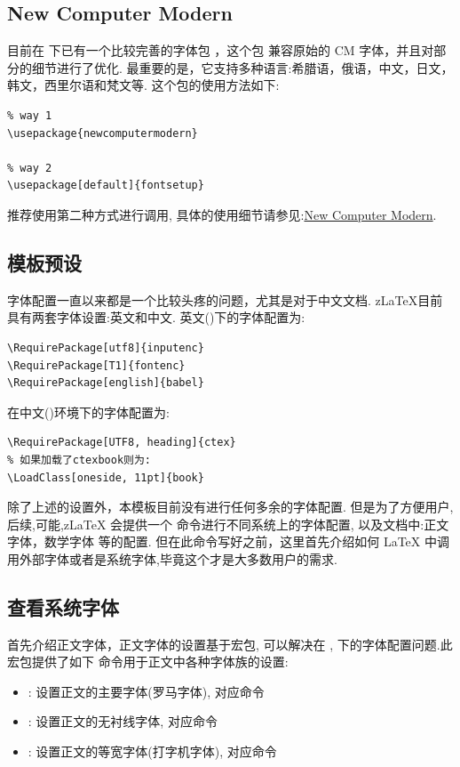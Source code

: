 \subsection{New Computer Modern}
目前在  下已有一个比较完善的字体包 ，这个包 
兼容原始的 CM 字体，并且对部分的细节进行了优化. 最重要的是，它支持多种语言:希腊语，俄语，中文，日文，韩文，西里尔语和梵文等.
这个包的使用方法如下:

\begin{verbatim}
% way 1
\usepackage{newcomputermodern}

% way 2
\usepackage[default]{fontsetup}
\end{verbatim}

推荐使用第二种方式进行调用, 具体的使用细节请参见:\href{https://ctan.org/pkg/newcomputermodern}{New Computer Modern}.

\subsection{模板预设}
字体配置一直以来都是一个比较头疼的问题，尤其是对于中文文档. z\LaTeX{}目前具有两套字体设置:英文和中文.
英文()下的字体配置为:
\begin{verbatim}
\RequirePackage[utf8]{inputenc}
\RequirePackage[T1]{fontenc}
\RequirePackage[english]{babel} 
\end{verbatim}

在中文()环境下的字体配置为:
\begin{verbatim}
\RequirePackage[UTF8, heading]{ctex}
% 如果加载了ctexbook则为:
\LoadClass[oneside, 11pt]{book}
\end{verbatim}

除了上述的设置外，本模板目前没有进行任何多余的字体配置. 但是为了方便用户,后续,可能,z\LaTeX{} 会提供一个
\cmd{\zlatexFontSetup}\index{\cmd{\zlatexFontSetup}} 命令进行不同系统上的字体配置, 以及文档中:正文字体，数学字体
等的配置. 但在此命令写好之前，这里首先介绍如何 \LaTeX{} 中调用外部字体或者是系统字体,毕竟这个才是大多数用户的需求.

\subsection{查看系统字体}
首先介绍正文字体，正文字体的设置基于宏包, 可以解决在 , 下的字体配置问题.此宏包提供了如下
命令用于正文中各种字体族的设置\index{\cmd{\setmainfont}}\index{\cmd{\setsansfont}}\index{\cmd{\setmonofont}}:
\begin{itemize}
    \item \cmd{\setmainfont}: 设置正文的主要字体(罗马字体), 对应命令\cmd{\textrm}
    \item \cmd{\setsansfont}: 设置正文的无衬线字体, 对应命令\cmd{\textsf}
    \item \cmd{\setmonofont}: 设置正文的等宽字体(打字机字体), 对应命令\cmd{\texttt}
\end{itemize}

